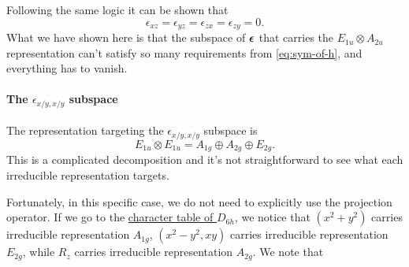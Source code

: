 \documentclass[hyperref, a4paper, 12pt]{article}
\begin{document}
Following the same logic it can be shown that 
\begin{equation}
    \epsilon_{xz} = \epsilon_{yz} = \epsilon_{zx} = \epsilon_{zy} = 0.
\end{equation}
What we have shown here is that the subspace of $\vb*{\epsilon}$ that carries the 
$E_{1u} \otimes A_{2u}$ representation can't satisfy so many requirements from \eqref{eq:sym-of-h},
and everything has to vanish.

\paragraph*{The $\epsilon_{x/y, x/y}$ subspace}

The representation targeting the $\epsilon_{x/y, x/y}$ subspace is 
\begin{equation}
    E_{1u} \otimes E_{1u} = A_{1g} \oplus A_{2g} \oplus E_{2g}.
\end{equation}
This is a complicated decomposition and it's not straightforward
to see what each irreducible representation targets.

Fortunately, in this specific case, we do not need to explicitly use the projection operator.
If we go to the \href{http://symmetry.constructor.university/cgi-bin/group.cgi?group=606&option=4}{character table of $D_{6h}$},
we notice that $(x^2 + y^2)$ carries irreducible representation $A_{1g}$,
$(x^2 - y^2, xy)$ carries irreducible representation $E_{2g}$,
while $R_z$ carries irreducible representation $A_{2g}$.
We note that 
\end{document}
